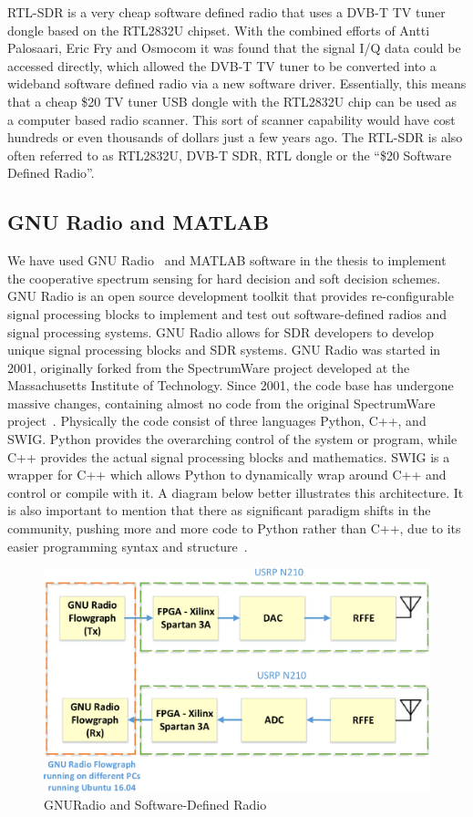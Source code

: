 RTL-SDR is a very cheap software defined radio that uses a DVB-T TV tuner dongle based on the RTL2832U chipset. With the combined efforts of Antti Palosaari, Eric Fry and Osmocom it was found that the signal I/Q data could be accessed directly, which allowed the DVB-T TV tuner to be converted into a wideband software defined radio via a new software driver. Essentially, this means that a cheap \$20 TV tuner USB dongle with the RTL2832U chip can be used as a computer based radio scanner. This sort of scanner capability would have cost hundreds or even thousands of dollars just a few years ago. The RTL-SDR is also often referred to as RTL2832U, DVB-T SDR, RTL dongle or the “\$20 Software Defined Radio”.

\subsection{GNU Radio and MATLAB}
We have used GNU Radio~\cite{gnradio} and MATLAB software in the thesis to implement the cooperative spectrum sensing for hard decision and soft decision schemes. GNU Radio  
is an open source development toolkit that provides re-configurable signal processing blocks to implement and test out software-defined radios and signal processing systems. GNU Radio allows for SDR developers to develop unique signal processing blocks and SDR systems. GNU Radio was started in 2001, originally forked from the SpectrumWare project developed at the Massachusetts Institute of Technology. Since 2001, the code base has undergone massive changes, containing almost no code from the original SpectrumWare project~\cite{bose1999virtual}. Physically the code consist of three languages Python, C++, and SWIG. Python provides the overarching control of the system or program, while C++ provides the actual signal processing blocks and mathematics. SWIG is a wrapper for C++ which allows Python to dynamically wrap around C++ and control or compile with it. A diagram below better illustrates this architecture. It is also important to mention that there as significant paradigm shifts in the community, pushing more and more code to Python rather than C++, due to its easier programming syntax and structure~\cite{collins2013implementation}.

\begin{figure}[ht!]
	\centering
	\includegraphics[width=\textwidth,keepaspectratio]{images/Gill/figs/gnuradio.eps}
    \caption{GNURadio and Software-Defined Radio} 
\label{gnuradio}      
\end{figure}

